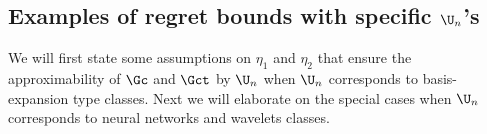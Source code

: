 \documentclass[preprint] {imsart}
\begin{document}

 



 \subsection{Examples of regret bounds with specific $\U_n$'s}
\label{sec: examples of Un}


We will first state some assumptions on $\eta_1$ and $\eta_2$ that ensure the approximability of $\Gc$ and $\Gct$ by $\U_n$ when $\U_n$ corresponds to  basis-expansion type classes. Next we will elaborate on the special cases when $\U_n$ corresponds to neural networks and wavelets classes.
\end{document}
